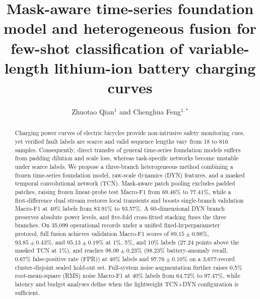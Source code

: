 \documentclass{iopjournal}
\begin{document}

\title{Mask-aware time-series foundation model and heterogeneous fusion for few-shot classification of variable-length lithium-ion battery charging curves}

\author{Zhuotao Qian$^1$ and Chenghua Feng$^{1,*}$}





\begin{abstract}
Charging power curves of electric bicycles provide non-intrusive safety monitoring cues, yet verified fault labels are scarce and valid sequence lengths vary from 18 to 816 samples. Consequently, direct transfer of general time-series foundation models suffers from padding dilution and scale loss, whereas task-specific networks become unstable under scarce labels. We propose a three-branch heterogeneous method combining a frozen time-series foundation model, raw-scale dynamics (DYN) features, and a masked temporal convolutional network (TCN). Mask-aware patch pooling excludes padded patches, raising frozen linear-probe test Macro-F1 from 69.46\% to 77.41\%, while a first-difference dual stream restores local transients and boosts single-branch validation Macro-F1 at 40\% labels from 83.91\% to 93.57\%. A 60-dimensional DYN branch preserves absolute power levels, and five-fold cross-fitted stacking fuses the three branches. On 35,099 operational records under a unified fixed-hyperparameter protocol, full fusion achieves validation Macro-F1 scores of $89.15\pm0.98\%$, $93.85\pm0.43\%$, and $95.13\pm0.19\%$ at 1\%, 5\%, and 10\% labels (27.24 points above the masked TCN at 1\%), and reaches $98.09\pm0.23\%$ (98.23\% battery-anomaly recall, 0.67\% false-positive rate (FPR)) at 40\% labels and $97.76\pm0.10\%$ on a 3,677-record cluster-disjoint sealed hold-out set. Full-system noise augmentation further raises 0.5\% root-mean-square (RMS) noise Macro-F1 at 40\% labels from 64.72\% to 97.47\%, while latency and budget analyses define when the lightweight TCN+DYN configuration is sufficient.
\end{abstract}
\end{document}
